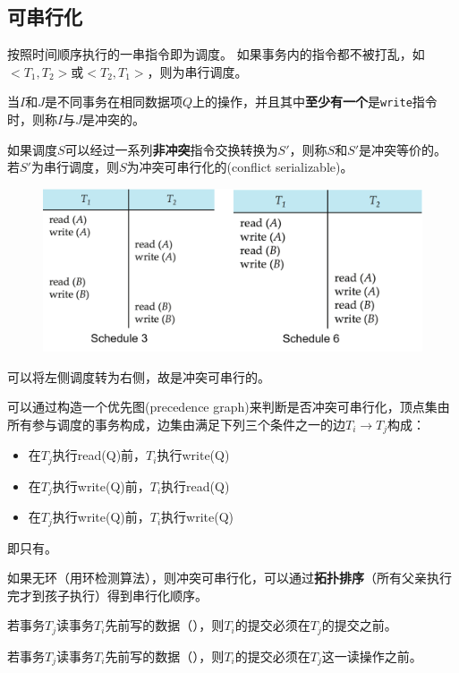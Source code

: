 \subsection{可串行化}
\begin{definition}[调度]
按照时间顺序执行的一串指令即为调度。
如果事务内的指令都不被打乱，如$<T_1,T_2>$或$<T_2,T_1>$，则为串行调度。
\end{definition}
\begin{definition}[冲突]
当$I$和$J$是不同事务在相同数据项$Q$上的操作，并且其中\textbf{至少有一个}是\verb'write'指令时，则称$I$与$J$是冲突的。
\end{definition}
\begin{definition}
如果调度$S$可以经过一系列\textbf{非冲突}指令交换转换为$S'$，则称$S$和$S'$是冲突等价的。
若$S'$为串行调度，则$S$为冲突可串行化的(conflict serializable)。
\end{definition}
\begin{figure}[H]
\centering
\includegraphics[width=0.8\linewidth]{fig/conflict_serializability.png}
\end{figure}
可以将左侧调度转为右侧，故是冲突可串行的。

可以通过构造一个优先图(precedence graph)来判断是否冲突可串行化，顶点集由所有参与调度的事务构成，边集由满足下列三个条件之一的边$T_i\to T_j$构成：
\begin{itemize}
	\item 在$T_j$执行read(Q)前，$T_i$执行write(Q)
	\item 在$T_j$执行write(Q)前，$T_i$执行read(Q)
	\item 在$T_j$执行write(Q)前，$T_i$执行write(Q)
\end{itemize}
即只有。

如果无环（用环检测算法），则冲突可串行化，可以通过\textbf{拓扑排序}（所有父亲执行完才到孩子执行）得到串行化顺序。

\begin{definition}[可恢复调度]
若事务$T_j$读事务$T_i$先前写的数据（），则$T_i$的提交必须在$T_j$的提交之前。
\end{definition}
\begin{definition}
若事务$T_j$读事务$T_i$先前写的数据（），则$T_i$的提交必须在$T_j$这一读操作之前。
\end{definition}

